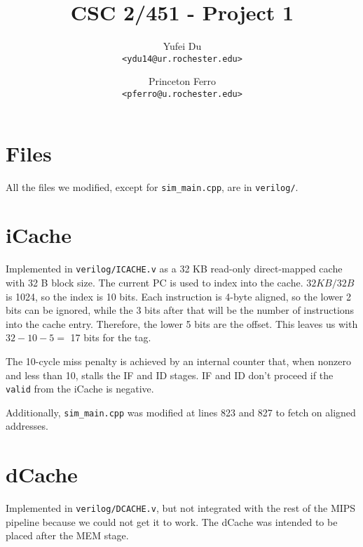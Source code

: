 \documentclass[a4paper,11pt]{article}
\title{CSC 2/451 - Project 1}
\author{
Yufei Du \\
\texttt{<ydu14@ur.rochester.edu>}
\and
Princeton Ferro \\
\texttt{<pferro@u.rochester.edu>}
}
\begin{document}
\maketitle

\section{Files}
All the files we modified, except for \texttt{sim\_main.cpp}, are in \texttt{verilog/}.

\section{iCache}
Implemented in \texttt{verilog/ICACHE.v} as a 32 KB read-only direct-mapped cache with 32 B block size. The current PC is used to index into the cache. $ 32KB / 32 B$ is 1024, so the index is 10 bits. Each instruction is 4-byte aligned, so the lower 2 bits can be ignored, while the 3 bits after that will be the number of instructions into the cache entry. Therefore, the lower 5 bits are the offset. This leaves us with $32-10-5 =$ 17 bits for the tag.

The 10-cycle miss penalty is achieved by an internal counter that, when nonzero and less than 10, stalls the IF and ID stages. IF and ID don't proceed if the \texttt{valid} from the iCache is negative.

Additionally, \texttt{sim\_main.cpp} was modified at lines 823 and 827 to fetch on aligned addresses.

\section{dCache}
Implemented in \texttt{verilog/DCACHE.v}, but not integrated with the rest of the MIPS pipeline because we could not get it to work. The dCache was intended to be placed after the MEM stage.
\end{document}
